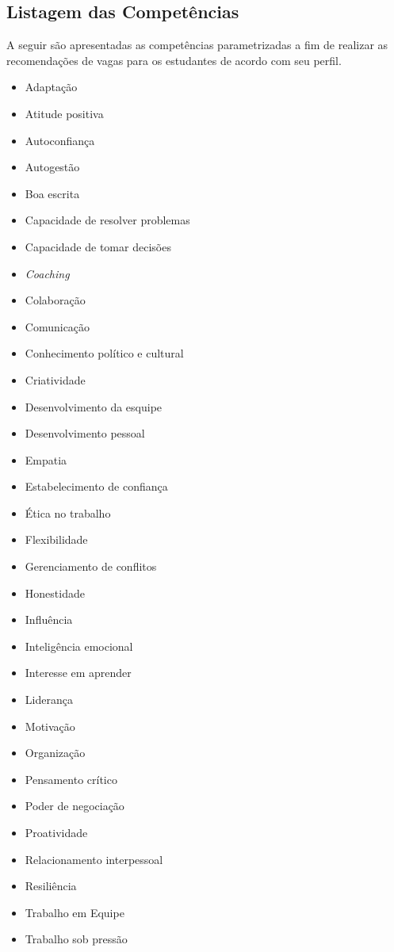 \subsection{Listagem das Competências}
A seguir são apresentadas as competências parametrizadas a fim de realizar as recomendações de vagas para os estudantes de acordo com seu perfil.

\begin{itemize}
	\label{softskills}
	\item Adaptação
	\item Atitude positiva
	\item Autoconfiança
	\item Autogestão
	\item Boa escrita
	\item Capacidade de resolver problemas
	\item Capacidade de tomar decisões
	\item \textit{Coaching}
	\item Colaboração
	\item Comunicação
	\item Conhecimento político e cultural
	\item Criatividade
	\item Desenvolvimento da esquipe
	\item Desenvolvimento pessoal
	\item Empatia
	\item Estabelecimento de confiança
	\item Ética no trabalho
	\item Flexibilidade
	\item Gerenciamento de conflitos
	\item Honestidade
	\item Influência
	\item Inteligência emocional
	\item Interesse em aprender
	\item Liderança
	\item Motivação
	\item Organização
	\item Pensamento crítico
	\item Poder de negociação
	\item Proatividade
	\item Relacionamento interpessoal
	\item Resiliência
	\item Trabalho em Equipe
	\item Trabalho sob pressão
\end{itemize}